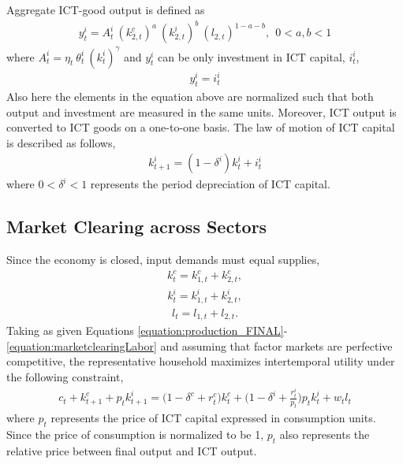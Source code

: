\documentclass[12pt]{article}
\begin{document}
Aggregate ICT-good output is defined as
\begin{eqnarray}\label{equation:production_ICT_aggregate}
	y^i_t = A^i_t \ ( k^c_{2,t} )^a \ ( k^i_{2,t} )^b \ ( l_{2,t} )^{1-a-b}, \ \ 0 < a,b < 1
\end{eqnarray}
where $A^i_t = \eta_t \ \theta^i_t \ (k^i_{t})^{\gamma}$ and $y^i_t$ can be only investment in ICT capital, $i^i_t$,
\begin{eqnarray}\label{equation:resourceICT}
y^i_t = i^i_t
\end{eqnarray}
Also here the elements in the equation above are normalized such that both output and investment are measured in the same units. Moreover, ICT output is converted to ICT goods on a one-to-one basis. The law of motion of ICT capital is described as follows,
\begin{eqnarray}\label{equation:LOM_ICT}
k^i_{t+1} = (1 - \delta^i) k^i_t + i^i_t
\end{eqnarray}
where $0 < \delta^i < 1$ represents the period depreciation of ICT capital.

\subsection{Market Clearing across Sectors}

Since the economy is closed, input demands must equal supplies,
\begin{eqnarray}\label{equation:marketclearingHard}
k^c_t = k^c_{1,t} + k^c_{2,t},
\end{eqnarray}
\begin{eqnarray}\label{equation:marketclearingICT}
k^i_t = k^i_{1,t} + k^i_{2,t}, 
\end{eqnarray}
\begin{eqnarray}\label{equation:marketclearingLabor}
l_t = l_{1,t} + l_{2,t}.
\end{eqnarray}
Taking as given Equations \ref{equation:production_FINAL}-\ref{equation:marketclearingLabor} and assuming that factor markets are perfective competitive, the representative household maximizes intertemporal utility under the following constraint,
\begin{eqnarray}\label{equation:resourceHH}
	c_t + k^c_{t+1} +p_t k^i_{t+1} = \bigg( 1 - \delta^c + r^c_t \bigg) k^c_t + \bigg( 1 - \delta^i + \frac{r^i_t}{p_t} \bigg) p_t k^i_t + w_t l_t	
\end{eqnarray}
where $p_t$ represents the price of ICT capital expressed in consumption units. Since the price of consumption is normalized to be 1, $p_t$ also represents the relative price between final output and ICT output.
\end{document}
